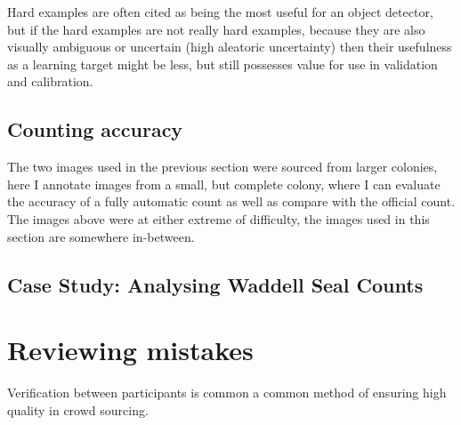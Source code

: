 Hard examples are often cited as being the most useful for an object detector, but if the hard examples are not really hard examples, because they are also visually ambiguous or uncertain (high aleatoric uncertainty) then their usefulness as a learning target might be less, but still possesses value for use in validation and calibration.


\subsection{Counting accuracy}

The two images used in the previous section were sourced from larger colonies, here I annotate images from a small, but complete colony, where I can evaluate the accuracy of a fully automatic count as well as compare with the official count. The images above were at either extreme of difficulty, the images used in this section are somewhere in-between. 



\subsection{Case Study: Analysing Waddell Seal Counts}




\section {Reviewing mistakes}

Verification between participants is common a common method of ensuring high quality in crowd sourcing.

